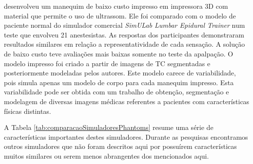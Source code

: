 \textcite{Mashari2018} desenvolveu um manequim de baixo custo impresso em impressora 3D com material que permite o uso de ultrassom. Ele foi comparado com o modelo de paciente normal do simulador comercial \textit{SimULab Lumbar Epidural Trainer} num teste que envolveu 21 anestesistas. As respostas dos participantes demonstraram resultados similares em relação a representatividade de cada sensação. A solução de baixo custo teve avaliações mais baixas somente no teste da apalpação. O modelo impresso foi criado a partir de imagens de \acrshort{TC} segmentadas e posteriormente modeladas pelos autores. Este modelo carece de variabilidade, pois simula apenas um modelo de corpo para cada manequim impresso. Esta variabilidade pode ser obtida com um trabalho de obtenção, segmentação e modelagem de diversas imagens médicas referentes a pacientes com características físicas distintas.

A Tabela \ref{tab:comparacaoSimuladoresPhantoms} resume uma série de características importantes destes simuladores. Durante as pesquisas encontramos outros simuladores que não foram descritos aqui por possuírem  características muitos similares ou serem menos abrangentes dos mencionados aqui.

